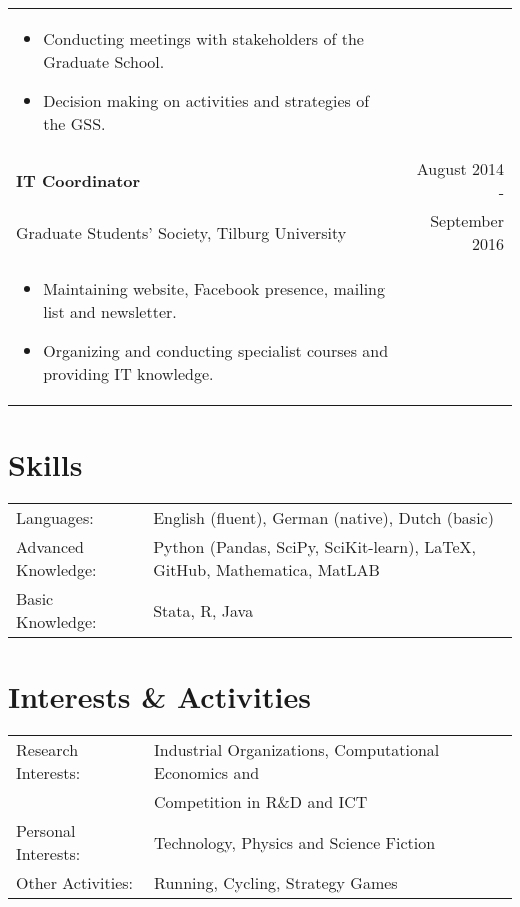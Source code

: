 \documentclass[a4paper,10pt]{article} %
\begin{document}
\begin{tabular}{p{12cm} r}
\begin{itemize}[noitemsep]
		\item Conducting meetings with stakeholders of the Graduate School.
		\item Decision making on activities and strategies of the GSS.
	\end{itemize}&\\
	\textbf{IT Coordinator} &August 2014 -\\
	Graduate Students' Society, {Tilburg University}  & September 2016\phantom{ -}\\
	\begin{itemize}[noitemsep]
	\item Maintaining website, Facebook presence, mailing list and newsletter.
	\item Organizing and conducting specialist courses and providing IT knowledge.
\end{itemize}&\\
\end{tabular}


\section{Skills}

\begin{tabular}{lp{9cm}}
	Languages: & English (fluent), German (native), Dutch (basic)\\
	Advanced Knowledge: & Python (Pandas, SciPy, SciKit-learn), \LaTeX, GitHub, Mathematica, MatLAB \\
	Basic Knowledge: & Stata, R, Java
\end{tabular}


\section{Interests \& Activities}
\begin{tabular}{ll}
	Research Interests: & Industrial Organizations, Computational Economics and \\
						& Competition in R\&D and ICT\\
	Personal Interests: & Technology, Physics and Science Fiction\\
	Other Activities:   & Running, Cycling, Strategy Games
\end{tabular}
\end{document}
